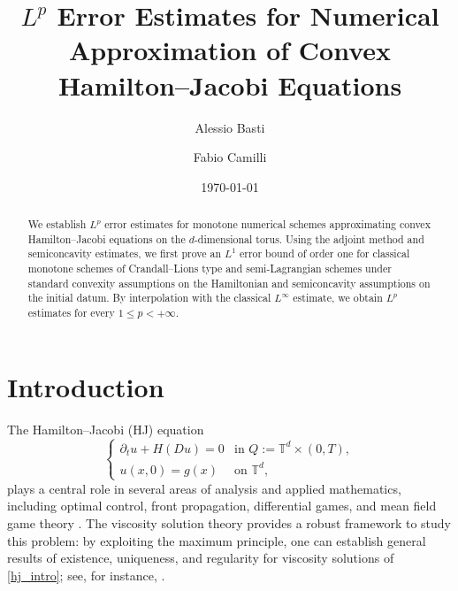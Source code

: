 \documentclass[11pt]{amsart}
\theoremstyle{remark}
\theoremstyle{definition}
\theoremstyle{Claim}
\newcommand{\virg}{``}
\theoremstyle{plain}
\begin{document}
	
	\title[]{$L^p$ Error Estimates for Numerical Approximation of Convex Hamilton--Jacobi Equations}
	
	\author{Alessio Basti}
	\author{Fabio Camilli}
\address{Engineering and Geology Department, University \virg G. d'Annunzio'' Chieti-Pescara,
	viale Pindaro 42, 65127 Pescara (Italy)}
	
	
		
	
	
	\date{\today}
	
\begin{abstract}
	We establish $L^p$ error estimates for monotone numerical schemes approximating convex Hamilton--Jacobi equations on the $d$-dimensional torus. Using the adjoint method and semiconcavity estimates, we first prove an $L^1$ error bound of order one for classical monotone schemes of Crandall–Lions type and semi-Lagrangian schemes under standard convexity assumptions on the Hamiltonian and semiconcavity assumptions on the initial datum. By interpolation with the classical $L^\infty$ estimate, we obtain $L^p$ estimates for every $1\le p<+\infty$. 
\end{abstract}
	
	\maketitle
	
\section{Introduction}
The Hamilton--Jacobi (HJ) equation
\begin{equation}\label{hj_intro}
	\begin{cases}
		\partial_t u + H(Du) = 0 & \text{in } Q := \mathbb{T}^d\times(0,T),\\[4pt]
		u(x,0) = g(x) & \text{on } \mathbb{T}^d,
	\end{cases}
\end{equation}
plays a central role in several areas of analysis and applied mathematics, including optimal control, front propagation, differential games, and mean field game theory \cite{achdou}. The viscosity solution theory provides a robust framework to study this problem: by exploiting the maximum principle, one can establish general results of existence, uniqueness, and regularity for viscosity solutions of \eqref{hj_intro}; see, for instance, \cite{bcd}.
\end{document}
